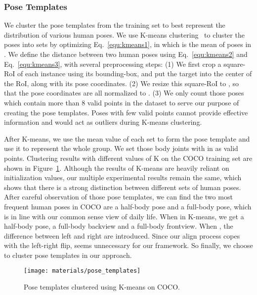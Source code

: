 \documentclass[10pt,twocolumn,letterpaper]{article}
\begin{document}
\subsubsection{Pose Templates}
We cluster the pose templates from the training set to best represent the distribution of various human poses. We use K-means clustering~\cite{forgy1965cluster} to cluster the poses  into  sets  by optimizing Eq.~\ref{equ:kmeans1}, in which  is the mean of poses in . We define the distance between two human poses using Eq.~\ref{equ:kmeans2} and Eq.~\ref{equ:kmeans3}, with several preprocessing steps: 
(1) We first crop a square-RoI of each instance using its bounding-box, and put the target into the center of the RoI, along with its pose coordinates.
(2) We resize this square-RoI to , so that the pose coordinates are all normalized to .
(3) We only count those poses which contain more than 8 valid points in the dataset to serve our purpose of creating the pose templates. Poses with few valid points cannot provide effective information and would act as outliers during K-means clustering.

\vspace{-0.3cm}





\vspace{0.1cm}

\noindent After K-means, we use the mean value of each set  to form the pose template and use it to represent the
whole group. We set those body joints with  in  as valid points. Clustering results with different values of
K on the COCO training set are shown in Figure~\ref{fig:templates}. Although the results of K-means are heavily reliant on
initialization values, our multiple experimental results remain the same, which shows that there is a strong distinction between
different sets of human poses. After careful observation of those pose templates, we can find the two most frequent human poses
in COCO are a half-body pose and a full-body pose, which is in line with our common sense view of daily life. When  in
K-means, we get a half-body pose, a full-body backview and a full-body frontview. When , the difference between left
and right are introduced. Since our align process copes with the left-right flip,  seems unnecessary for our framework. So finally, we choose  to cluster pose templates in our approach.


\begin{figure}[t]
\centering
\texttt{[image: materials/pose\_templates]} 
\setlength{\abovecaptionskip}{-0.3cm}
\setlength{\belowcaptionskip}{-0.5cm}
\caption{Pose templates clustered using K-means on COCO.}
\label{fig:templates}
\end{figure}
\end{document}
